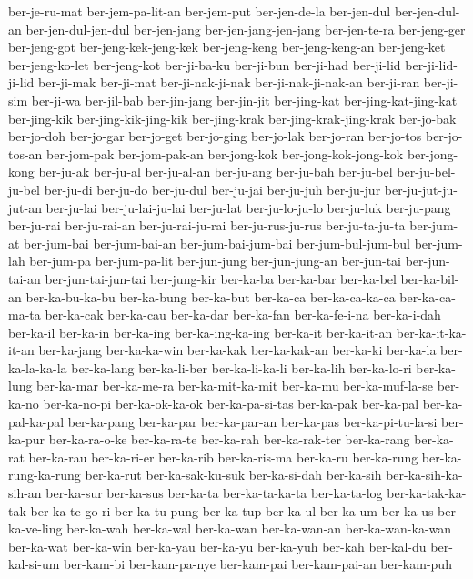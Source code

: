 {ber-je-ru-mat ber-jem-pa-lit-an ber-jem-put ber-jen-de-la ber-jen-dul
ber-jen-dul-an ber-jen-dul-jen-dul ber-jen-jang ber-jen-jang-jen-jang
ber-jen-te-ra ber-jeng-ger ber-jeng-got ber-jeng-kek-jeng-kek
ber-jeng-keng ber-jeng-keng-an ber-jeng-ket ber-jeng-ko-let ber-jeng-kot
ber-ji-ba-ku ber-ji-bun ber-ji-had ber-ji-lid ber-ji-lid-ji-lid ber-ji-mak
ber-ji-mat ber-ji-nak-ji-nak ber-ji-nak-ji-nak-an ber-ji-ran ber-ji-sim
ber-ji-wa ber-jil-bab ber-jin-jang ber-jin-jit ber-jing-kat
ber-jing-kat-jing-kat ber-jing-kik ber-jing-kik-jing-kik ber-jing-krak
ber-jing-krak-jing-krak ber-jo-bak ber-jo-doh ber-jo-gar ber-jo-get
ber-jo-ging ber-jo-lak ber-jo-ran ber-jo-tos ber-jo-tos-an ber-jom-pak
ber-jom-pak-an ber-jong-kok ber-jong-kok-jong-kok ber-jong-kong ber-ju-ak
ber-ju-al ber-ju-al-an ber-ju-ang ber-ju-bah ber-ju-bel ber-ju-bel-ju-bel
ber-ju-di ber-ju-do ber-ju-dul ber-ju-jai ber-ju-juh ber-ju-jur
ber-ju-jut-ju-jut-an ber-ju-lai ber-ju-lai-ju-lai ber-ju-lat
ber-ju-lo-ju-lo ber-ju-luk ber-ju-pang ber-ju-rai ber-ju-rai-an
ber-ju-rai-ju-rai ber-ju-rus-ju-rus ber-ju-ta-ju-ta ber-jum-at ber-jum-bai
ber-jum-bai-an ber-jum-bai-jum-bai ber-jum-bul-jum-bul ber-jum-lah
ber-jum-pa ber-jum-pa-lit ber-jun-jung ber-jun-jung-an ber-jun-tai
ber-jun-tai-an ber-jun-tai-jun-tai ber-jung-kir ber-ka-ba ber-ka-bar
ber-ka-bel ber-ka-bil-an ber-ka-bu-ka-bu ber-ka-bung ber-ka-but ber-ka-ca
ber-ka-ca-ka-ca ber-ka-ca-ma-ta ber-ka-cak ber-ka-cau ber-ka-dar
ber-ka-fan ber-ka-fe-i-na ber-ka-i-dah ber-ka-il ber-ka-in ber-ka-ing
ber-ka-ing-ka-ing ber-ka-it ber-ka-it-an ber-ka-it-ka-it-an ber-ka-jang
ber-ka-ka-win ber-ka-kak ber-ka-kak-an ber-ka-ki ber-ka-la ber-ka-la-ka-la
ber-ka-lang ber-ka-li-ber ber-ka-li-ka-li ber-ka-lih ber-ka-lo-ri
ber-ka-lung ber-ka-mar ber-ka-me-ra ber-ka-mit-ka-mit ber-ka-mu
ber-ka-muf-la-se ber-ka-no ber-ka-no-pi ber-ka-ok-ka-ok ber-ka-pa-si-tas
ber-ka-pak ber-ka-pal ber-ka-pal-ka-pal ber-ka-pang ber-ka-par
ber-ka-par-an ber-ka-pas ber-ka-pi-tu-la-si ber-ka-pur ber-ka-ra-o-ke
ber-ka-ra-te ber-ka-rah ber-ka-rak-ter ber-ka-rang ber-ka-rat ber-ka-rau
ber-ka-ri-er ber-ka-rib ber-ka-ris-ma ber-ka-ru ber-ka-rung
ber-ka-rung-ka-rung ber-ka-rut ber-ka-sak-ku-suk ber-ka-si-dah ber-ka-sih
ber-ka-sih-ka-sih-an ber-ka-sur ber-ka-sus ber-ka-ta ber-ka-ta-ka-ta
ber-ka-ta-log ber-ka-tak-ka-tak ber-ka-te-go-ri ber-ka-tu-pung ber-ka-tup
ber-ka-ul ber-ka-um ber-ka-us ber-ka-ve-ling ber-ka-wah ber-ka-wal
ber-ka-wan ber-ka-wan-an ber-ka-wan-ka-wan ber-ka-wat ber-ka-win
ber-ka-yau ber-ka-yu ber-ka-yuh ber-kah ber-kal-du ber-kal-si-um
ber-kam-bi ber-kam-pa-nye ber-kam-pai ber-kam-pai-an ber-kam-puh
}
